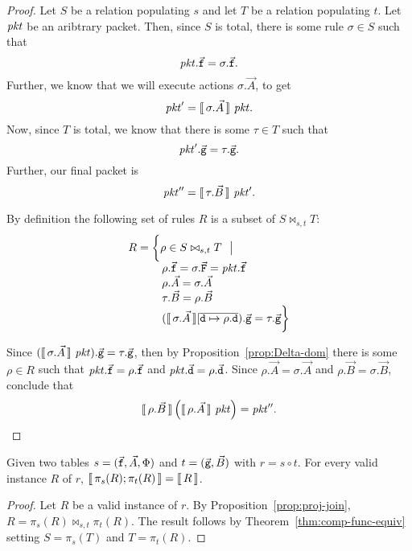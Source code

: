 \begin{proof}
  Let $S$ be a relation populating $s$ and let $T$ be a relation
  populating $t$.
  Let $\mathit{pkt}$ be an aribtrary packet. Then, since $S$ is total, there
  is some rule $\sigma \in S$ such that
  \[\mathit{pkt}.\vec{\texttt{f}} = \sigma.\vec{\texttt{f}}.\] Further, we know that
  we will execute actions $\sigma.\vec A$, to get
  \[\mathit{pkt}' = \llbracket\,\sigma.\vec A\,\rrbracket~\mathit{pkt}.\] Now, since $T$ is total, we know
  that there is some $\tau \in T$ such that
  \[\mathit{pkt}'.\vec{\texttt{g}} = \tau.\vec{\texttt{g}}.\] Further, our final
  packet is \[\mathit{pkt}'' = \llbracket\,\tau.\vec{B}\,\rrbracket~\mathit{pkt}'.\]

  By definition the following set of rules $R$ is a subset of $S \bowtie_{s,t}T$:
  \[\begin{array}{l}
      R  = \bigg\{\rho \in S \bowtie_{s,t} T~~\big|\\
      \qquad\quad \rho.\vec{\texttt{f}} = \sigma.\vec{\texttt{F}} = \mathit{pkt}.\vec{\texttt{f}}\\
      \qquad\quad \rho.\vec A = \sigma.\vec A \\
      \qquad\quad \tau.\vec B = \rho.\vec B \\
      \qquad\quad (\llbracket\,\sigma.\vec A\,\rrbracket[\overline{\texttt{d} \mapsto \rho.\texttt{d}}).\vec{\texttt{g}} =\tau.\vec{ \texttt{g}} \bigg\}
    \end{array}\]

  Since $(\llbracket\,\sigma.\vec A\,\rrbracket~\mathit{pkt}).\vec{\texttt{g}} = \tau.\vec{\texttt{g}}$, then by 
  Proposition~\ref{prop:Delta-dom} there is some $\rho \in R$ such
  that $\mathit{pkt}.\vec{\texttt{f}} = \rho.\vec{\texttt{f}}$ and $\mathit{pkt}.\vec{\texttt{d}} =
  \rho.\vec{\texttt{d}}$. Since $\rho.\vec A = \sigma.\vec A$ and
  $\rho.\vec B = \sigma.\vec B$, conclude that
  \[\llbracket\,\rho.\vec B\,\rrbracket\left(\llbracket\,\rho.\vec A\,\rrbracket~\mathit{pkt}\right) = \mathit{pkt}''.\]
\end{proof}


\begin{theorem}
  \label{thm:decomp-func-equiv}
  Given two tables $s = (\vec{\texttt{f}},\vec A,\Phi)$ and
  $t = (\vec{\texttt{g}},\vec B)$ with $r = s \circ t$. For every valid
  instance $R$ of $r$,
  $\llbracket\,\pi_s(R);\pi_t(R)\,\rrbracket = \llbracket\,R\,\rrbracket$.
\end{theorem}

\begin{proof}
  Let $R$ be a valid instance of $r$. By
  Proposition~\ref{prop:proj-join},
  $R = \pi_s(R)\bowtie_{s,t}\pi_t(R)$. The result follows by
  Theorem~\ref{thm:comp-func-equiv} setting $S = \pi_s(T)$ and
  $T=\pi_t(R)$.
\end{proof}

